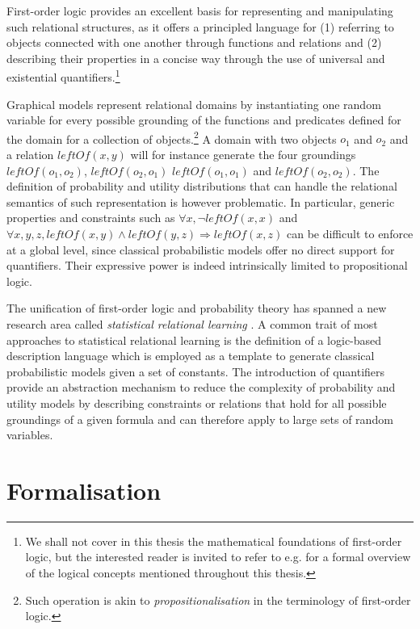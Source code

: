 First-order logic provides an excellent basis for representing and manipulating such relational structures, as it offers a principled language for (1) referring to objects connected with one another through functions and relations and (2) describing their properties in a concise way through the use of universal and existential quantifiers.\footnote{We shall not cover in this thesis the mathematical foundations of first-order logic, but the interested reader is invited to refer to e.g. \cite{gamut1991logic} for a formal overview of the logical concepts mentioned throughout this thesis.}

Graphical models represent relational domains by instantiating one random variable for every possible grounding of the functions and predicates defined for the domain for a collection of objects.\footnote{Such operation is akin to \textit{propositionalisation} in the terminology of first-order logic.}  A domain with two objects $o_1$ and $o_2$ and a relation $\mathit{leftOf}(x,y)$ will for instance generate the four groundings $\mathit{leftOf}(o_1,o_2)$, $\mathit{leftOf}(o_2,o_1)$ $\mathit{leftOf}(o_1,o_1)$ and $\mathit{leftOf}(o_2,o_2)$. The definition of probability and utility distributions that can handle the relational semantics of such representation is however problematic. In particular, generic properties and constraints such as $\forall x, \neg \mathit{leftOf}(x,x)$ and $\forall x, y, z, \mathit{leftOf}(x,y) \land \mathit{leftOf}(y,z) \Rightarrow \mathit{leftOf}(x,z)$ can be difficult to enforce at a global level, since classical probabilistic models offer no direct support for quantifiers.  Their expressive power is indeed intrinsically limited to propositional logic. 
 
The unification of first-order logic and probability theory has spanned a new research area called \textit{statistical relational learning} \citep{getoor:srlbook07}. A common trait of most approaches to statistical relational learning is the definition of a logic-based description language which is employed as a template to generate classical probabilistic models given a set of constants. The introduction of quantifiers provide an abstraction mechanism to reduce the complexity of probability and utility models by describing constraints or relations that hold for all possible groundings of a given formula and can therefore apply to large sets of random variables. 

\section{Formalisation}
\label{sec:formalisation}


